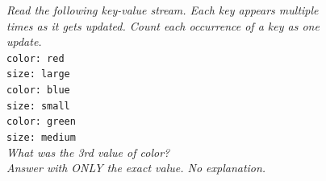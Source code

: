 \documentclass[11pt]{article}
\begin{document}
\begin{figure}[h]
\small
\centering
\begin{minipage}[t]{0.48\textwidth}
\begin{tcolorbox}[
    colframe=black!30, colback=gray!4,
    boxrule=0.5pt, arc=2pt,
    left=6pt, right=6pt, top=4pt, bottom=4pt,
    equal height group=fmts,
    title={\textbf{Plain} (\texttt{flat\_nolabel}; default in \S\ref{sec:failure})},
    fonttitle=\small\bfseries,
    coltitle=black]
\emph{Read the following key-value stream. Each key appears
multiple times as it gets updated. Count each occurrence of a key as
one update.}\\[4pt]
\texttt{color: red}\\
\texttt{size: large}\\
\texttt{color: blue}\\
\texttt{size: small}\\
\texttt{color: green}\\
\texttt{size: medium}\\[4pt]
\emph{What was the 3rd value of color?}\\
\emph{Answer with ONLY the exact value. No explanation.}
\end{tcolorbox}


\end{minipage}
\end{figure}
\end{document}
